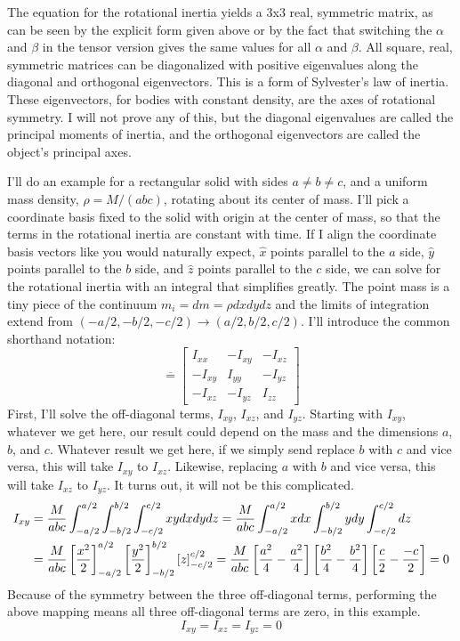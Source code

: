 \documentclass[10pt]{article}
\begin{document}
The equation for the rotational inertia yields a 
3x3 real, symmetric matrix, as can be seen by the explicit form given 
above or by the fact that switching the $\alpha$ and $\beta$ in the 
tensor version gives the same values for all $\alpha$ and $\beta$. 
All square, real, 
symmetric matrices can be diagonalized with positive eigenvalues along 
the diagonal and orthogonal eigenvectors. This is a 
form of Sylvester's law of inertia. These eigenvectors, 
for bodies with constant density, are the axes of rotational symmetry. 
I will not prove any of this, but the 
diagonal eigenvalues are called the principal moments of inertia, and 
the orthogonal eigenvectors are called the object's principal axes.

I'll do an example for a rectangular solid with sides $a \neq b \neq c$, and 
a uniform mass density, $\rho=M/(abc)$, rotating about its center of mass. 
I'll pick a coordinate basis fixed to the solid with origin at the 
center of mass, so that the terms in the rotational inertia are 
constant with time. If 
I align the coordinate basis vectors like you would naturally expect, 
$\hat{x}$ points parallel to the $a$ side, 
$\hat{y}$ points parallel to the $b$ side, and $\hat{z}$ points parallel 
to the $c$ side, we can solve for the rotational inertia with an integral 
that simplifies greatly. The point mass is a tiny piece of the continuum 
$m_i = dm = \rho dxdydz$ and the limits of integration extend from 
$(-a/2,-b/2,-c/2)\rightarrow (a/2,b/2,c/2)$. I'll introduce the common 
shorthand notation:
\[
\overline = 
\begin{bmatrix}
    I_{xx} & -I_{xy} & -I_{xz} \\
    -I_{xy} & I_{yy} & -I_{yz} \\
    -I_{xz} & -I_{yz} & I_{zz}
\end{bmatrix}
\]
First, I'll solve the off-diagonal terms, $I_{xy}$, $I_{xz}$, and $I_{yz}$. 
Starting with $I_{xy}$, whatever we get here, our result could depend on 
the mass and the dimensions $a$, $b$, and $c$. Whatever result we get 
here, if we simply send replace $b$ with $c$ and vice versa, this will take 
$I_{xy}$ to $I_{xz}$. Likewise, replacing $a$ with $b$ and vice versa, this 
will take $I_{xz}$ to $I_{yz}$. It turns out, it will not be this complicated.
\begin{align}
    I_{xy} &= \frac{M}{abc}\int_{-a/2}^{a/2}\int_{-b/2}^{b/2}
        \int_{-c/2}^{c/2} xy dxdydz
    = \frac{M}{abc}\int_{-a/2}^{a/2}xdx\int_{-b/2}^{b/2}ydy
        \int_{-c/2}^{c/2}dz \notag\\
    &= \frac{M}{abc}\left[\frac{x^2}{2}\right]_{-a/2}^{a/2}
        \left[\frac{y^2}{2}\right]_{-b/2}^{b/2}
        \left[z\right]_{-c/2}^{c/2}
    = \frac{M}{abc}
        \left[\frac{a^2}{4}-\frac{a^2}{4}\right]
        \left[\frac{b^2}{4}-\frac{b^2}{4}\right]
        \left[\frac{c}{2}-\frac{-c}{2}\right] = 0
\end{align}
Because of the symmetry between the three off-diagonal terms, performing the 
above mapping means all three off-diagonal terms are zero, in this 
example.
\begin{equation}
    I_{xy} = I_{xz} = I_{yz} = 0
\end{equation}
\end{document}
